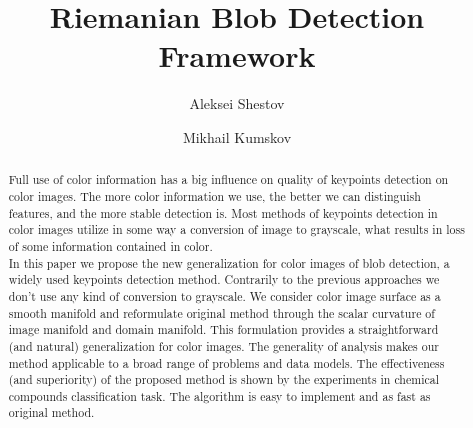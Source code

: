 \documentclass{llncs}
\begin{document}
\title{Riemanian Blob Detection Framework}
%

\author{Aleksei Shestov \and Mikhail Kumskov} 
%



\maketitle              %

\begin{abstract}
%
Full use of color information has a big influence on quality of keypoints detection on color images. The more color information we use, the better we can distinguish features, and the more stable detection is. Most methods of keypoints detection in color images utilize in some way a conversion of image to grayscale, what results in loss of some information contained in color. \\

In this paper we propose the new generalization for color images of blob detection, a widely used keypoints detection method. Contrarily to the previous approaches we don’t use any kind of conversion to grayscale. We consider color image surface as a smooth manifold and reformulate original method through the scalar curvature of image manifold and domain manifold. This formulation provides a straightforward (and natural) generalization for color images. The generality of analysis makes our method applicable to a broad range of problems and data models. The effectiveness (and superiority) of the proposed method is shown by the experiments in chemical compounds classification task. The algorithm is easy to implement and as fast as original method. 
 \end{abstract}  
%
\end{document}
